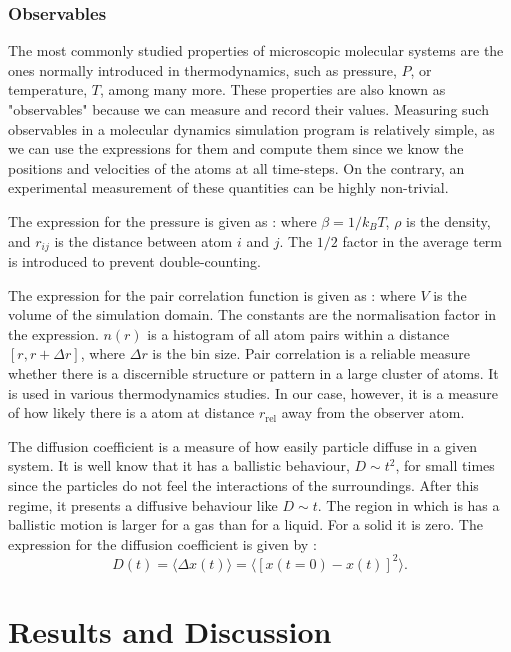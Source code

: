 \documentclass[pra,aps,superscriptaddress,amssymb,amsmath,reprint,noeprint,floatfix]{revtex4-2}
\begin{document}
\subsubsection{\label{subsubsec: Observables}Observables}
The most commonly studied properties of microscopic molecular systems are the ones normally introduced in thermodynamics, such as pressure, $P$, or temperature, $T$, among many more. These properties are also known as "observables" because we can measure and record their values. Measuring such observables in a molecular dynamics simulation program is relatively simple, as we can use the expressions for them and compute them since we know the positions and velocities of the atoms at all time-steps. On the contrary, an experimental measurement of these quantities can be highly non-trivial.

The expression for the pressure is given as \cite{tudelftnotes}:
\pressure
where $\beta=1/k_BT$, $\rho$ is the density, and $r_{ij}$ is the distance between atom $i$ and $j$. The $1/2$ factor in the average term is introduced to prevent double-counting.

The expression for the pair correlation function is given as \cite{tudelftnotes}:
\paircorr
where $V$ is the volume of the simulation domain. The constants are the normalisation factor in the expression. $n(r)$ is a histogram of all atom pairs within a distance $[r,r+\Delta r]$, where $\Delta r$ is the bin size. Pair correlation is a reliable measure whether there is a discernible structure or pattern in a large cluster of atoms. It is used in various thermodynamics studies. In our case, however, it is a measure of how likely there is a atom at distance $r_\mathrm{rel}$ away from the observer atom.

The diffusion coefficient is a measure of how easily particle diffuse in a given system. It is well know that it has a ballistic behaviour, $D\sim t^2$, for small times since the particles do not feel the interactions of the surroundings. After this regime, it presents a diffusive behaviour like $D\sim t$. The region in which is has a ballistic motion is larger for a gas than for a liquid. For a solid it is zero. The expression for the diffusion coefficient is given by \cite{tudelftnotes}:
\begin{equation}
    D (t) = \langle \Delta x(t) \rangle = \langle [x(t=0)-x(t)]^2 \rangle.
\end{equation}

\section{\label{sec: Results and Discussion}Results and Discussion}
\end{document}
